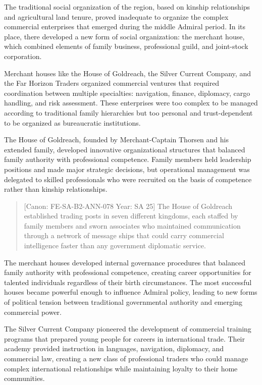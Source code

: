 The traditional social organization of the region, based on kinship
relationships and agricultural land tenure, proved inadequate to
organize the complex commercial enterprises that emerged during the
middle Admiral period. In its place, there developed a new form of
social organization: the merchant house, which combined elements of
family business, professional guild, and joint-stock corporation.

Merchant houses like the House of Goldreach, the Silver Current Company,
and the Far Horizon Traders organized commercial ventures that required
coordination between multiple specialties: navigation, finance,
diplomacy, cargo handling, and risk assessment. These enterprises were
too complex to be managed according to traditional family hierarchies
but too personal and trust-dependent to be organized as bureaucratic
institutions.

The House of Goldreach, founded by Merchant-Captain Thorsen and his
extended family, developed innovative organizational structures that
balanced family authority with professional competence. Family members
held leadership positions and made major strategic decisions, but
operational management was delegated to skilled professionals who were
recruited on the basis of competence rather than kinship relationships.

\begin{quote}
{[}Canon: FE-SA-B2-ANN-078 \textbar{} Year: SA 25{]} The House of
Goldreach established trading posts in seven different kingdoms, each
staffed by family members and sworn associates who maintained
communication through a network of message ships that could carry
commercial intelligence faster than any government diplomatic service.
\end{quote}

The merchant houses developed internal governance procedures that
balanced family authority with professional competence, creating career
opportunities for talented individuals regardless of their birth
circumstances. The most successful houses became powerful enough to
influence Admiral policy, leading to new forms of political tension
between traditional governmental authority and emerging commercial
power.

The Silver Current Company pioneered the development of commercial
training programs that prepared young people for careers in
international trade. Their academy provided instruction in languages,
navigation, diplomacy, and commercial law, creating a new class of
professional traders who could manage complex international
relationships while maintaining loyalty to their home communities.

